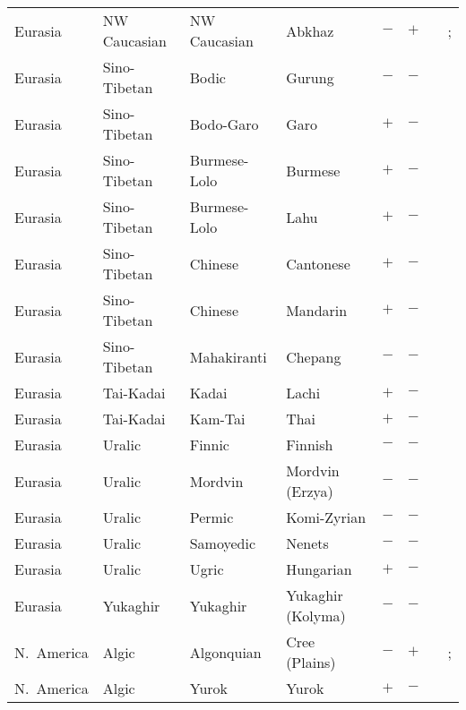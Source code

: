 \begin{landscape}
\begin{longtable}{l>{\raggedright\arraybackslash}p{2.2cm}>{\raggedright}p{2.5cm}>{\raggedright\arraybackslash}p{2.5cm}cc>{\raggedright\arraybackslash}p{3.4cm}>{\raggedright\arraybackslash}p{3.4cm}}
Eurasia & NW Caucasian & NW Caucasian & Abkhaz & $-$ & $+$ & \citealt{Gil2013} & \citealt{Corbett2013}; \citealt[108]{Spruit1986}\\
Eurasia & Sino-Tibetan & Bodic & Gurung & $-$ & $-$ & \citealt[297]{Nichols1992}& \citealt[297]{Nichols1992}\\
Eurasia & Sino-Tibetan & Bodo-Garo & Garo & $+$ & $-$ & \citealt{Gil2013} & \citealt[passim]{Burling1961}\\
Eurasia & Sino-Tibetan & Burmese-Lolo & Burmese & $+$ & $-$ & \citealt{Gil2013} & \citealt{Corbett2013}\\
Eurasia & Sino-Tibetan & Burmese-Lolo & Lahu & $+$ & $-$ & \citealt{Gil2013} & \citealt{Corbett2013}\\
Eurasia & Sino-Tibetan & Chinese & Cantonese & $+$ & $-$ & \citealt{Gil2013} & \citealt{Corbett2013}\\
Eurasia & Sino-Tibetan & Chinese & Mandarin & $+$ & $-$ & \citealt{Gil2013} & \citealt{Corbett2013}\\
Eurasia & Sino-Tibetan & Mahakiranti & Chepang & $-$ & $-$ & \citealt{Gil2013} & \citealt[42, 50, 51, 55]{Caughley1982}\\
Eurasia & Tai-Kadai & Kadai & Lachi & $+$ & $-$ & \citealt{Gil2013} & \citealt[68--77]{Kosaka2000}\\
Eurasia & Tai-Kadai & Kam-Tai & Thai & $+$ & $-$ & \citealt{Gil2013} & \citealt{Corbett2013}\\
Eurasia & Uralic & Finnic & Finnish & $-$ & $-$ & \citealt{Gil2013} & \citealt{Corbett2013}\\
Eurasia & Uralic & Mordvin & Mordvin (Erzya) & $-$ & $-$ & \citealt{Gil2013} & \citealt[191--197]{Zaicz1998}\\
Eurasia & Uralic & Permic & Komi-Zyrian & $-$ & $-$ & \citealt{Gil2013} & \citealt[295]{Nichols1992}\\
Eurasia & Uralic & Samoyedic & Nenets & $-$ & $-$ & \citealt{Gil2013} & \citealt{Corbett2013}\\
Eurasia & Uralic & Ugric & Hungarian & $+$ & $-$ & \citealt{Gil2013} & \citealt{Corbett2013}\\
Eurasia & Yukaghir & Yukaghir & Yukaghir (Kolyma) & $-$ & $-$ & \citealt{Gil2013} & \citealt{Corbett2013}\\
N.~America & Algic & Algonquian & Cree (Plains) & $-$ & $+$ & \citealt{Gil2013} & \citealt{Corbett2013}; \citealt[20--24, 33--38]{Wolfart1973}\\
N.~America & Algic & Yurok & Yurok & $+$ & $-$ & \citealt[299]{Nichols1992}& \citealt{Corbett2013}\\

\end{longtable}
\end{landscape}
